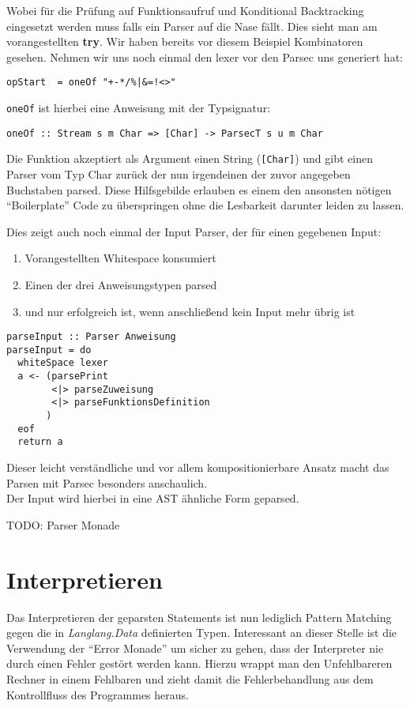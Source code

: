 \documentclass[12pt,german]{article}
\begin{document}
\noindent Wobei für die Prüfung auf Funktionsaufruf und Konditional Backtracking
eingesetzt werden muss falls ein Parser auf die Nase fällt. Dies sieht
man am vorangestellten \textbf{try}. Wir haben bereits vor diesem
Beispiel Kombinatoren gesehen. Nehmen wir uns noch einmal den lexer
vor den Parsec uns generiert hat:
\begin{lstlisting}
opStart  = oneOf "+-*/%|&=!<>"
\end{lstlisting}
\texttt{oneOf} ist hierbei eine Anweisung mit der Typsignatur:
\begin{lstlisting}
oneOf :: Stream s m Char => [Char] -> ParsecT s u m Char
\end{lstlisting}
Die Funktion akzeptiert als Argument einen String (\texttt{[Char]}) und
gibt einen Parser vom Typ Char zurück der nun irgendeinen der zuvor
angegeben Buchstaben parsed. Diese Hilfsgebilde erlauben es einem den
ansonsten nötigen ``Boilerplate'' Code zu überspringen ohne die
Lesbarkeit darunter leiden zu lassen.\cite{ParsecChar14}

Dies zeigt auch noch einmal der Input Parser, der für einen gegebenen Input:
\begin{enumerate}
\item Vorangestellten Whitespace konsumiert
\item Einen der drei Anweisungstypen parsed
\item und nur erfolgreich ist, wenn anschließend kein Input mehr übrig ist
\end{enumerate}

\begin{lstlisting}
parseInput :: Parser Anweisung
parseInput = do
  whiteSpace lexer
  a <- (parsePrint
        <|> parseZuweisung
        <|> parseFunktionsDefinition
       )
  eof
  return a
\end{lstlisting}

\noindent Dieser leicht verständliche und vor allem kompositionierbare Ansatz
macht das Parsen mit Parsec besonders anschaulich.\\
Der Input wird hierbei in eine AST ähnliche Form geparsed.

TODO: Parser Monade \cite{GHEM}

\section{Interpretieren}

Das Interpretieren der geparsten Statements ist nun lediglich Pattern
Matching gegen die in \textit{Langlang.Data} definierten Typen.
Interessant an dieser Stelle ist die Verwendung der ``Error Monade''
um sicher zu gehen, dass der Interpreter nie durch einen Fehler gestört
werden kann. Hierzu wrappt man den Unfehlbareren
Rechner in einem Fehlbaren und zieht damit die Fehlerbehandlung aus
dem Kontrollfluss des Programmes heraus.
\end{document}
